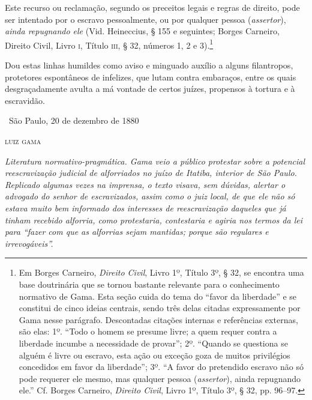 Este recurso ou reclamação, segundo os preceitos legais e regras de
direito, pode ser intentado por o escravo pessoalmente, ou por qualquer
pessoa (\emph{assertor}), \emph{ainda repugnando ele} (Vid.
Heineccius, § 155 e seguintes; Borges Carneiro, Direito Civil,
Livro \textsc{i}, Título \textsc{iii}, § 32, números 1, 2 e 3).\footnote{Em Borges
  Carneiro, \emph{Direito Civil}, Livro 1º, Título 3º, § 32, se encontra
  uma base doutrinária que se tornou bastante relevante para o
  conhecimento normativo de Gama. Esta seção cuida do tema do ``favor da
  liberdade'' e se constitui de cinco ideias centrais, sendo três delas
  citadas expressamente por Gama nesse parágrafo. Descontadas citações
  internas e referências externas, são elas: 1º. ``Todo o homem se
  presume livre; a quem requer contra a liberdade incumbe a necessidade
  de provar''; 2º. ``Quando se questiona se alguém é livre ou
  escravo, esta ação ou exceção goza de muitos privilégios concedidos em
  favor da liberdade''; 3º. ``A favor do pretendido escravo não só pode
  requerer ele mesmo, mas qualquer pessoa (\emph{assertor}), ainda
  repugnando ele.'' Cf. Borges Carneiro, \emph{Direito Civil}, Livro 1º,
  Título 3º, § 32, pp. 96--97.}

Dou estas linhas humildes
como aviso e minguado auxílio a alguns filantropos, protetores
espontâneos de infelizes, que lutam contra embaraços, entre os quais
desgraçadamente avulta a má vontade de certos juízes, propensos à
tortura e à escravidão.

\medskip

\hfill\ São Paulo, 20 de dezembro de 1880

\hfill\textsc{luiz gama}


\begin{resumo}
\emph{Literatura normativo-pragmática. Gama veio a público protestar
sobre a potencial reescravização judicial de alforriados no juízo de
Itatiba, interior de São Paulo. Replicado algumas vezes na imprensa, o
texto visava, sem dúvidas, alertar o advogado do senhor de escravizados,
assim como o juiz local, de que ele não só estava muito bem informado
dos interesses de reescravização daqueles que já tinham recebido
alforria, como protestaria, contestaria e agiria nos termos da lei para
``fazer com que as alforrias sejam mantidas; porque são regulares e
irrevogáveis''. }
\end{resumo}

